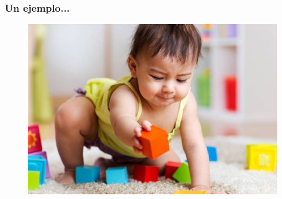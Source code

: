 \documentclass[10pt]{beamer}
\begin{document}
\begin{frame}
    \frametitle{Un ejemplo...}
    \begin{figure}[!h] 
        \centering
        \includegraphics[width=1\textwidth]{img/bebe}
    \end{figure} 
\end{frame}
\end{document}
